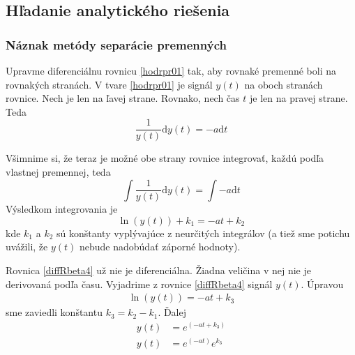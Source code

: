 \documentclass[a4paper, 10pt, ]{article}
\begin{document}
\begin{center}

	\makebox[\textwidth][c]{%
	
	}

	\label{RCclanok_v2_sch_v2}

\end{center}












\subsection{Hľadanie analytického riešenia}


\subsubsection{Náznak metódy separácie premenných}

Upravme diferenciálnu rovnicu \eqref{hodrpr01} tak, aby rovnaké premenné boli na rovnakých stranách. V tvare \eqref{hodrpr01} je signál $y(t)$ na oboch stranách rovnice. Nech je len na ľavej strane. Rovnako, nech čas $t$ je len na pravej strane. Teda
\begin{equation} \label{diffRbeta2}
    \frac{1}{y(t)}\text{d}y(t) = - a \text{d}t
\end{equation}

Všimnime si, že teraz je možné obe strany rovnice integrovať, každú podľa vlastnej premennej, teda
\begin{equation} \label{diffRbeta3}
    \int \frac{1}{y(t)}\text{d}y(t) =  \int - a \text{d}t
\end{equation}
Výsledkom integrovania je
\begin{equation} \label{diffRbeta4}
     \ln \left(  y(t)  \right) + k_1 =   - a t + k_2
\end{equation}
kde $k_1$ a $k_2$ sú konštanty vyplývajúce z neurčitých integrálov (a tiež sme potichu uvážili, že $y(t)$ nebude nadobúdať záporné hodnoty).


Rovnica \eqref{diffRbeta4} už nie je diferenciálna. Žiadna veličina v nej nie je derivovaná podľa času. Vyjadrime z rovnice \eqref{diffRbeta4} signál $y(t)$. Úpravou 
\begin{align}
    \ln \left(  y(t)  \right)  =   - a t + k_3
\end{align}
sme zaviedli konštantu $k_3 = k_2 - k_1$. Ďalej
\begin{subequations}
    \begin{align}
        y(t)   &=  e^{\left( - a t + k_3 \right)} \\
        y(t)   &=  e^{\left( - a t \right)}  e^{k_3} \label{rawRies}
    \end{align}
\end{subequations}
\end{document}
